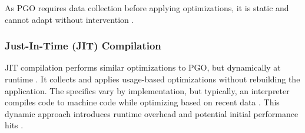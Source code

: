 \documentclass[main.tex]{subfiles}
\begin{document}
As PGO requires data collection before applying optimizations, it is static and cannot adapt without intervention \cite{Wade_Kulkarni_Jantz_2017}.

\subsubsection{Just-In-Time (JIT) Compilation}

JIT compilation performs similar optimizations to PGO, but dynamically at runtime \cite{Wade_Kulkarni_Jantz_2017}. It collects and applies usage-based optimizations without rebuilding the application. The specifics vary by implementation, but typically, an interpreter compiles code to machine code while optimizing based on recent data \cite{Wade_Kulkarni_Jantz_2017}. This dynamic approach introduces runtime overhead and potential initial performance hits \cite{Aycock_2003}.
\end{document}
